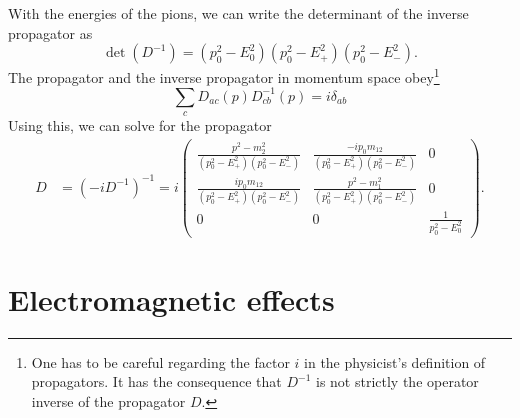 With the energies of the pions, we can write the determinant of the inverse propagator as
%
\begin{equation}
    \det(D^{-1}) = (p_0^2 - E_0^2) (p_0^2 - E_+^2) (p_0^2 - E_-^2).
\end{equation}
%
The propagator and the inverse propagator in momentum space obey\footnote{One has to be careful regarding the factor $i$ in the physicist's definition of propagators. It has the consequence that $D^{-1}$ is not strictly the operator inverse of the propagator $D$.}
%
\begin{equation}
    \sum_c D_{ac}(p)D_{cb}^{-1}(p) = i \delta_{ab}
\end{equation}
%
Using this, we can solve for the propagator
%
\begin{align}
    D & = (- iD^{-1})^{-1} 
    \label{free pion propagator}
    = i
    \begin{pmatrix}
        \frac{
            p^2 - m_2^2
        }
        {
            (p_0^2 - E_+^2)(p_0^2 - E_-^2)
        } 
        & \frac{
            - ip_0m_{12}
        }
        {
            (p_0^2 - E_+^2)(p_0^2 - E_-^2)
        } & 0 \\
        \frac{
            ip_0m_{12}
        }
        {
            (p_0^2 - E_+^2)(p_0^2 - E_-^2)
        }
        & \frac{
            p^2 - m_1^2
        }
        {
            (p_0^2 - E_+^2)(p_0^2 - E_-^2)
        } & 0 \\
        0 & 0 & 
        \frac{1}{p_0^2 - E_0^2}
    \end{pmatrix}.
\end{align}




\section{Electromagnetic effects}

